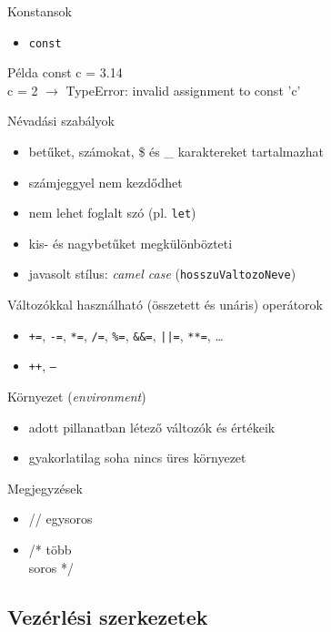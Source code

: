 \documentclass[usenames,dvipsnames,aspectratio=169]{beamer}
\begin{document}
\begin{frame}
    Konstansok
    \begin{itemize}
        \item \texttt{const}
    \end{itemize}
    \begin{exampleblock}{Példa}
        const c = 3.14\\
        c = 2 $\to$ TypeError: invalid assignment to const 'c'
    \end{exampleblock}
    \vfill
    Névadási szabályok
    \begin{itemize}
        \item betűket, számokat, \$ és \_ karaktereket tartalmazhat
        \item számjeggyel nem kezdődhet
        \item nem lehet foglalt szó (pl. \texttt{let})
        \item kis- és nagybetűket megkülönbözteti
        \item javasolt stílus: \emph{camel case} (\texttt{hosszuValtozoNeve})
    \end{itemize}
\end{frame}

\begin{frame}
    Változókkal használható (összetett és unáris) operátorok
    \begin{itemize}
        \item \texttt{+=}, \texttt{-=}, \texttt{*=}, \texttt{/=}, \texttt{\%=}, \texttt{\&\&=}, \texttt{||=}, \texttt{**=}, \dots 
        \item \texttt{++}, \texttt{--}
    \end{itemize}
    \vfill
    Környezet (\emph{environment})
    \begin{itemize}
        \item adott pillanatban létező változók és értékeik
        \item gyakorlatilag soha nincs üres környezet
    \end{itemize}
    \vfill
    Megjegyzések
    \begin{itemize}
        \item // egysoros
        \item /* több \\ \quad soros */
    \end{itemize}
\end{frame}

\subsection{Vezérlési szerkezetek}
\end{document}
